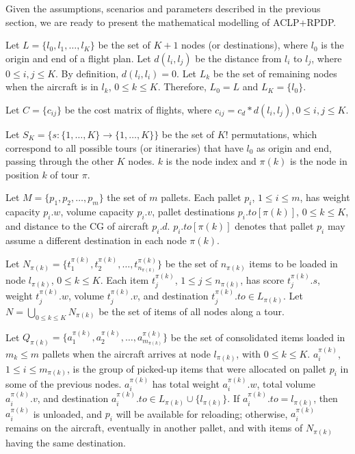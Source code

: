 \documentclass[preprint,authoryear]{elsarticle}
\begin{document}
Given the assumptions, scenarios and parameters described in the previous section, we are ready to present the mathematical modelling of ACLP+RPDP.

Let $L = \{ l_0, l_1, \ldots, l_K \}$ be the set of $K+1$ nodes (or destinations), where $l_0$ is the origin and end of a flight plan. Let $d(l_i,l_j)$ be the distance from $l_i$ to $l_j$, where $0 \leq i,j \leq K$. By definition, $d(l_i,l_i)=0$. Let $L_k$ be the set of remaining nodes when the aircraft is in $l_k$, $0 \leq k \leq K$. Therefore, $L_0=L$ and $L_K = \{ l_0 \}$.

Let $C=\{c_{ij}\}$ be the cost matrix of flights, where $c_{ij} = c_d*d(l_i,l_j), 0 \leq i,j \leq K$.

Let $S_K = \{s: \{1, \dots, K\} \rightarrow \{1, \dots, K\} \}$ be the set of $K!$ permutations, which correspond to all possible tours (or itineraries) that have $l_0$ as origin and end, passing through the other $K$ nodes. {\color{blue} $k$ is the node index and $\pi(k)$ is the node in position $k$ of tour $\pi$}.

Let $M = \{p_1, p_2, \ldots, p_m \}$ the set of $m$ pallets. Each pallet $p_i$, $1 \leq i \leq m$, has weight capacity $p_i.w$, volume capacity $p_i.v$, pallet destinations $p_i.to[{\pi(k)}]$, $0 \leq k \leq K$, and distance to the CG of aircraft $p_i.d$. $p_i.to[{\pi(k)}]$ denotes that pallet $p_i$ may assume a different destination in each node ${\pi(k)}$.

Let $N_{\pi(k)} = \{t^{\pi(k)}_1, t^{\pi(k)}_2, \ldots, t^{\pi(k)}_{n_{\pi(k)}} \}$ be the set of $n_{\pi(k)}$ items to be loaded in node $l_{\pi(k)}$, $0 \leq k \leq K$. Each item $t^{\pi(k)}_j$, $1 \leq j \leq n_{\pi(k)}$, has score $t^{\pi(k)}_j.s$, weight $t^{\pi(k)}_j.w$, volume $t^{\pi(k)}_j.v$, and destination $t^{\pi(k)}_j.to \in L_{\pi(k)}$. Let $N = \bigcup_{0 \leq k \leq K} N_{\pi(k)}$ be the set of items of all nodes along a tour.

Let $Q_{\pi(k)} = \{a^{\pi(k)}_1, a^{\pi(k)}_2, \ldots, a^{\pi(k)}_{m_{\pi(k)}} \}$ be the set of consolidated items loaded in $m_k \leq m$ pallets when the aircraft arrives at node $l_{\pi(k)}$, with $0 \leq k \leq K$. $a^{\pi(k)}_i$, $1 \leq i \leq m_{\pi(k)}$, is the group of picked-up items that were allocated on pallet $p_i$ in some of the previous nodes. $a^{\pi(k)}_i$ has total weight $a^{\pi(k)}_i.w$, total volume $a^{\pi(k)}_i.v$, and destination $a^{\pi(k)}_i.to \in L_{\pi(k)} \cup \{l_{\pi(k)}\}$. If $a^{\pi(k)}_i.to = l_{\pi(k)}$, then $a^{\pi(k)}_i$ is unloaded, and $p_i$ will be available for reloading; otherwise, $a^{\pi(k)}_i$ remains on the aircraft, eventually in another pallet, and with items of $N_{\pi(k)}$ having the same destination.
\end{document}
